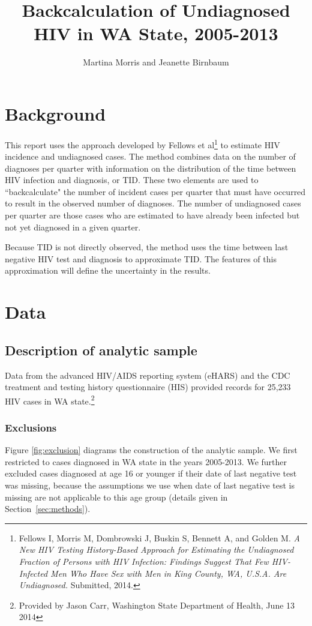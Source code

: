 \documentclass{article}\usepackage[]{graphicx}\usepackage[]{color}
\begin{document}
\title{Backcalculation of Undiagnosed HIV in WA State, 2005-2013}
\author{Martina Morris and Jeanette Birnbaum}
\maketitle

\section{Background}
This report uses the approach developed by Fellows et al\footnote{Fellows I, Morris M, Dombrowski J, Buskin S, Bennett A, and Golden M. \emph{A New HIV Testing History-Based Approach for Estimating the Undiagnosed Fraction of Persons with HIV Infection: Findings Suggest That Few HIV-Infected Men Who Have Sex with Men in King County, WA, U.S.A. Are  Undiagnosed.} Submitted, 2014.} to estimate HIV incidence and undiagnosed cases. The method combines data on the number of diagnoses per quarter with information on the distribution of the time between HIV infection and diagnosis, or TID. These two elements are used to ``backcalculate" the number of incident cases per quarter that must have occurred to result in the observed number of diagnoses. The number of undiagnosed cases per quarter are those cases who are estimated to have already been infected but not yet diagnosed in a given quarter.

Because TID is not directly observed, the method uses the time between last negative HIV test and diagnosis to approximate TID. The features of this approximation will define the uncertainty in the results.

\section{Data}
\subsection{Description of analytic sample}
Data from the advanced HIV/AIDS reporting system (eHARS) and the CDC treatment and testing history questionnaire (HIS) provided records for 25,233 HIV cases in WA state.\footnote{Provided by Jason Carr, Washington State Department of Health, June 13 2014}
\subsubsection{Exclusions}
Figure \ref{fig:exclusion} diagrams the construction of the analytic sample. We first restricted to cases diagnosed in WA state in the years 2005-2013. We further excluded cases diagnosed at age 16 or younger if their date of last negative test was missing, because the assumptions we use when date of last negative test is missing are not applicable to this age group (details given in Section~\ref{sec:methods}).
\end{document}
